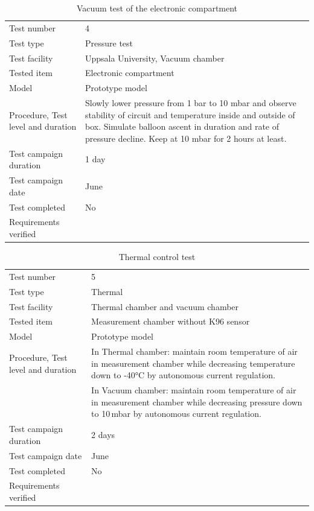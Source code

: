 \documentclass[
  a4paper,
  11pt,
  openany,
  parskip,
  toc=totoc,
  listof=totoc,
  bibliography=totoc
]{scrreprt}
\begin{document}
\begin{table}[H]
\centering
\caption{Vacuum test of the electronic compartment}
\label{tab:test4}
\begin{tabular}{L{5cm}L{10cm}}
\toprule
Test number & 4 \\
Test type & Pressure test \\
Test facility & Uppsala University, Vacuum chamber \\
Tested item & Electronic compartment \\
Model & Prototype model \\
Procedure, Test level and duration & Slowly lower pressure from 1 bar to 10 mbar and observe stability of circuit and temperature inside and outside of box. Simulate balloon ascent in duration and rate of pressure decline. Keep at 10 mbar for 2 hours at least. \\
Test campaign duration & 1 day \\
Test campaign date & June \\
Test completed & No \\
Requirements verified & \\
\bottomrule
\end{tabular}
\end{table}


\begin{table}[H]
\centering
\caption{Thermal control test}
\label{tab:test_thermal}
\begin{tabular}{L{5cm}L{10cm}}
\toprule
Test number & 5 \\
Test type & Thermal \\
Test facility & Thermal chamber and vacuum chamber \\
Tested item & Measurement chamber without K96 sensor \\
Model & Prototype model \\
Procedure, Test level and duration & In Thermal chamber: maintain room temperature of air in measurement chamber while decreasing temperature down to -40°C by autonomous current regulation. \\
& In Vacuum chamber: maintain room temperature of air in measurement chamber while decreasing pressure down to 10\,mbar by autonomous current regulation.  \\
Test campaign duration & 2 days \\
Test campaign date & June \\
Test completed & No \\
Requirements verified & \\
\bottomrule
\end{tabular}
\end{table}
\end{document}
